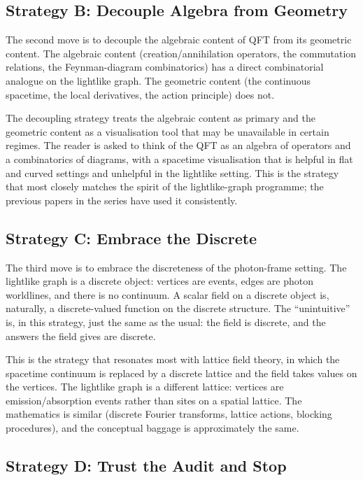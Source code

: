 \documentclass[11pt]{article}
\begin{document}
\subsection{Strategy B: Decouple Algebra from Geometry}

The second move is to decouple the algebraic content of QFT from its geometric content. The algebraic content (creation/annihilation operators, the commutation relations, the Feynman-diagram combinatorics) has a direct combinatorial analogue on the lightlike graph. The geometric content (the continuous spacetime, the local derivatives, the action principle) does not.

The decoupling strategy treats the algebraic content as primary and the geometric content as a visualisation tool that may be unavailable in certain regimes. The reader is asked to think of the QFT as an algebra of operators and a combinatorics of diagrams, with a spacetime visualisation that is helpful in flat and curved settings and unhelpful in the lightlike setting. This is the strategy that most closely matches the spirit of the lightlike-graph programme; the previous papers in the series have used it consistently.

\subsection{Strategy C: Embrace the Discrete}

The third move is to embrace the discreteness of the photon-frame setting. The lightlike graph is a discrete object: vertices are events, edges are photon worldlines, and there is no continuum. A scalar field on a discrete object is, naturally, a discrete-valued function on the discrete structure. The ``unintuitive'' is, in this strategy, just the same as the usual: the field is discrete, and the answers the field gives are discrete.

This is the strategy that resonates most with lattice field theory, in which the spacetime continuum is replaced by a discrete lattice and the field takes values on the vertices. The lightlike graph is a different lattice: vertices are emission/absorption events rather than sites on a spatial lattice. The mathematics is similar (discrete Fourier transforms, lattice actions, blocking procedures), and the conceptual baggage is approximately the same.

\subsection{Strategy D: Trust the Audit and Stop}
\end{document}
